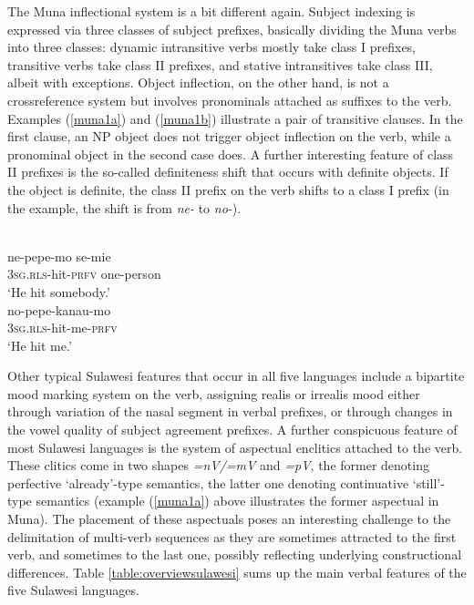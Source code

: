 The Muna inflectional system is a bit different again. Subject indexing is expressed via three classes of subject prefixes, basically dividing the Muna verbs into three classes: dynamic intransitive verbs mostly take class I prefixes, transitive verbs take class II prefixes, and stative intransitives take class III, albeit with exceptions. Object inflection, on the other hand, is not a crossreference system but involves pronominals attached as suffixes to the verb. Examples (\ref{muna1a}) and (\ref{muna1b}) illustrate a pair of transitive clauses. In the first clause, an NP object does not trigger object inflection on the verb, while a pronominal object in the second case does. A further interesting feature of class II prefixes is the so-called definiteness shift that occurs with definite objects. If the object is definite, the class II prefix on the verb shifts to a class I prefix (in the example, the shift is from \textit{ne-} to \textit{no-}).

\ea 
{}\\
\ea \label{muna1a}
\gll ne-pepe-mo se-mie \\
\textsc{3}\textsc{sg}.\textsc{rls}-hit-\textsc{prfv} one-person \\
\glft `He hit somebody.' \\ 
\ex \label{muna1b}
\gll no-pepe-kanau-mo \\ 
\textsc{3}\textsc{sg}.\textsc{rls}-hit-me-\textsc{prfv} \\
\glft `He hit me.' \\ 
\z
\z

Other typical Sulawesi features that occur in all five languages include a bipartite mood marking system on the verb, assigning realis or irrealis mood either through variation of the nasal segment in verbal prefixes, or through changes in the vowel quality of subject agreement prefixes. A further conspicuous feature of most Sulawesi languages is the system of aspectual enclitics attached to the verb. These clitics come in two shapes \textit{=nV/=mV} and \textit{=pV}, the former denoting perfective `already'-type semantics, the latter one denoting continuative `still'-type semantics (example (\ref{muna1a}) above illustrates the former aspectual in Muna). The placement of these aspectuals poses an interesting challenge to the delimitation of multi-verb sequences as they are sometimes attracted to the first verb, and sometimes to the last one, possibly reflecting underlying constructional differences. Table \ref{table:overviewsulawesi} sums up the main verbal features of the five Sulawesi languages.

